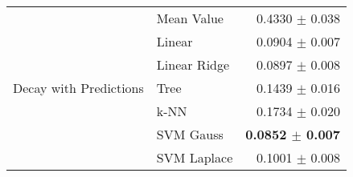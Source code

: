 \documentclass[10pt]{article}
\begin{document}
\begin{table}[H]
\begin{tabular}{llr}
    \hline
    \multirow{7}{*}{Decay with Predictions} & Mean Value   & 0.4330 $\pm$ 0.038 \\
                               & Linear       & 0.0904 $\pm$ 0.007 \\
                               & Linear Ridge & 0.0897 $\pm$ 0.008 \\
                               & Tree         & 0.1439 $\pm$ 0.016 \\
                               & k-NN         & 0.1734 $\pm$ 0.020 \\
                               & SVM Gauss    & \textbf{0.0852 $\pm$ 0.007} \\
                               & SVM Laplace  & 0.1001 $\pm$ 0.008 \\
    \hline\hline
  \end{tabular}
  \label{tab:homoresults}
\end{table}





\end{document}
